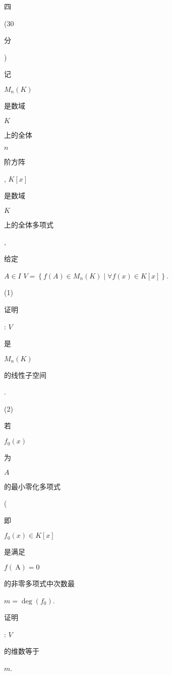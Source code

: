 \documentclass[10pt]{article}
\begin{document}
\begin{CJK}{UTF8}{mj}四\end{CJK}(30 \begin{CJK}{UTF8}{mj}分\end{CJK}) \begin{CJK}{UTF8}{mj}记\end{CJK} $M_{n}(K)$ \begin{CJK}{UTF8}{mj}是数域\end{CJK} $K$ \begin{CJK}{UTF8}{mj}上的全体\end{CJK} $n$ \begin{CJK}{UTF8}{mj}阶方阵\end{CJK}, $K[x]$ \begin{CJK}{UTF8}{mj}是数域\end{CJK} $K$ \begin{CJK}{UTF8}{mj}上的全体多项式\end{CJK}, \begin{CJK}{UTF8}{mj}给定\end{CJK} $A \in I$ $V=\left\{f(A) \in M_{n}(K) \mid \forall f(x) \in K[x]\right\} .$

(1) \begin{CJK}{UTF8}{mj}证明\end{CJK}: $V$ \begin{CJK}{UTF8}{mj}是\end{CJK} $M_{n}(K)$ \begin{CJK}{UTF8}{mj}的线性子空间\end{CJK}.

(2) \begin{CJK}{UTF8}{mj}若\end{CJK} $f_{0}(x)$ \begin{CJK}{UTF8}{mj}为\end{CJK} $A$ \begin{CJK}{UTF8}{mj}的最小零化多项式\end{CJK} (\begin{CJK}{UTF8}{mj}即\end{CJK} $f_{0}(x) \in K[x]$ \begin{CJK}{UTF8}{mj}是满足\end{CJK} $f(\mathrm{~A})=0$ \begin{CJK}{UTF8}{mj}的非零多项式中次数最\end{CJK} $m=\operatorname{deg}\left(f_{0}\right)$. \begin{CJK}{UTF8}{mj}证明\end{CJK}: $V$ \begin{CJK}{UTF8}{mj}的维数等于\end{CJK} $m$.
\end{document}
